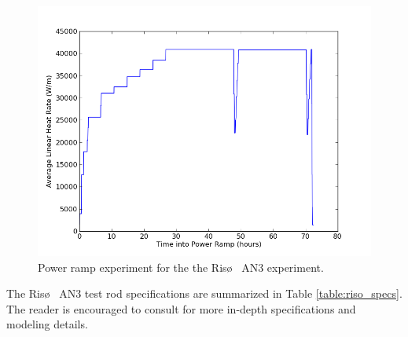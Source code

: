 \begin{figure}
\caption{\label{fig:riso_power_ramp}
Power ramp experiment for the the Ris\o~ AN3 experiment.}
 \begin{center}
  \includegraphics[scale=.75]{./Chapter4/power_ramp.png}
 \end{center}
\end{figure} 
The Ris\o~ AN3 test rod specifications are summarized in Table \ref{table:riso_specs}. The reader is encouraged to consult \cite{Perez2} for more in-depth specifications and modeling details.  

